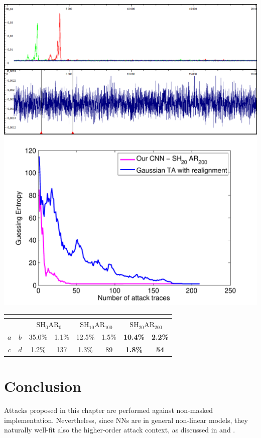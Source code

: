   \begin{minipage}[c]{\textwidth}

    \centering
    \includegraphics[width=.45\textwidth]{../Figures/CHES2017/snrs.png} 
    \includegraphics[width=.45\textwidth]{../Figures/CHES2017/TA_CNN_smartcard.pdf} 
    \label{fig:SNR}

    \centering


\begin{tabular}{|c|c|c|c|c|c|c|c|}
\multicolumn{8}{c}{}\\
\hline
\multicolumn{2}{|c|}{} & \multicolumn{2}{c|}{$\mathrm{SH}_{0}\mathrm{AR}_{0}$} & \multicolumn{2}{c|}{$\mathrm{SH}_{10}\mathrm{AR}_{100}$} & \multicolumn{2}{c|}{$\mathrm{SH}_{20}\mathrm{AR}_{200}$} \\ \hline
$a$        & $b$       & 35.0\%                     & 1.1\%                    & 12.5\%                      & 1.5\%                      & \textbf{10.4\%}             & \textbf{2.2\%}             \\ \hline
$c$        & $d$       & 1.2\%                      & 137                      & 1.3\%                       & 89                         & \textbf{1.8\%}              & \textbf{54}                \\ \hline
\end{tabular}

\label{tab:res_AES}

  \end{minipage}
  
 \section{Conclusion}
 Attacks proposed in this chapter are performed against non-masked implementation. Nevertheless, since NNs are in general non-linear models, they naturally well-fit also the higher-order attack context, as discussed in \cite{maghrebi2016breaking} and \cite{DLwhitepaper}.\\